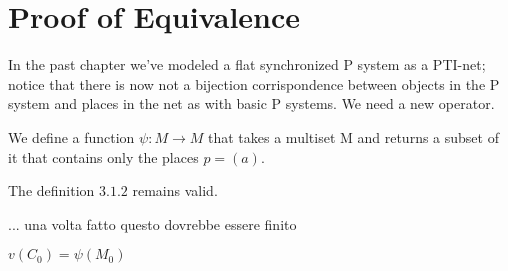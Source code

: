 \chapter{Proof of Equivalence}

In the past chapter we've modeled a flat synchronized P system as a PTI-net; 
notice that there is now not a bijection corrispondence between objects in the P system and places in the net as with basic P systems.
We need a new operator.

\begin{definition}
We define a function $\psi: M \rightarrow M$ that takes a multiset M and returns a subset of it 
that contains only the places $p=(a)$.
\end{definition}

The definition \hyperref[def:map_conf]{$3.1.2$} remains valid.

\begin{definition}
... una volta fatto questo dovrebbe essere finito
\end{definition}

\begin{fact}[]
$v(C_0)=\psi(M_{0})$
\end{fact}

